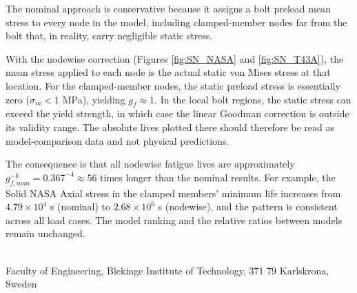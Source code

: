 \documentclass[a4paper,twoside]{bth}
\newcommand{\faculty}{Engineering}
\begin{document}
The nominal approach is conservative because it assigns a bolt preload mean stress to every node in the model, including clamped-member nodes far from the bolt that, in reality, carry negligible static stress.

With the nodewise correction (Figures \ref{fig:SN_NASA} and \ref{fig:SN_T43A}), the mean stress applied to each node is the actual static von Mises stress at that location. For the clamped-member nodes, the static preload stress is essentially zero ($\sigma_m < 1$ MPa), yielding $g_f \approx 1$. In the local bolt regions, the static stress can exceed the yield strength, in which case the linear Goodman correction is outside its validity range. The absolute lives plotted there should therefore be read as model-comparison data and not physical predictions.

The consequence is that all nodewise fatigue lives are approximately $g_{f, nom}^{-k} = 0.367^{-4} \approx 56$ times longer than the nominal results. For example, the Solid NASA Axial stress in the clamped members' minimum life increases from $4.79 \times 10^4$ s (nominal) to $2.68 \times 10^6$ s (nodewise), and the pattern is consistent across all load cases. The model ranking and the relative ratios between models remain unchanged.



\cleardoublepage
\thispagestyle{empty}
\vspace*{\fill}
\clearpage{\thispagestyle{empty}}
\changepage{3cm}{1cm}{-0.5cm}{-0.5cm}{}{-1.5cm}{}{}{}
\vspace*{\fill}
\center

{\bthcsnotextlogo{3cm}}
\\
\noindent\makebox[\linewidth]{\rule{\textwidth}{1pt}} 
Faculty of \faculty, Blekinge Institute of Technology, 371 79 Karlskrona, Sweden
\end{document}

